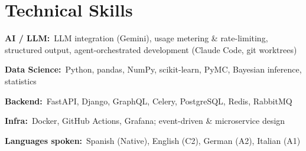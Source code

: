 \documentclass[10pt,a4paper]{article}
\newcommand{\skill}[2]{\textbf{\color{soft}#1:}\ #2\par\vspace{1.5pt}}
\begin{document}
\section*{Technical Skills}
\skill{AI / LLM}{LLM integration (Gemini), usage metering \& rate-limiting, structured output, agent-orchestrated development (Claude Code, git worktrees)}
\skill{Data Science}{Python, pandas, NumPy, scikit-learn, PyMC, Bayesian inference, statistics}
\skill{Backend}{FastAPI, Django, GraphQL, Celery, PostgreSQL, Redis, RabbitMQ}
\skill{Infra}{Docker, GitHub Actions, Grafana; event-driven \& microservice design}
\skill{Languages spoken}{Spanish (Native), English (C2), German (A2), Italian (A1)}
\end{document}
